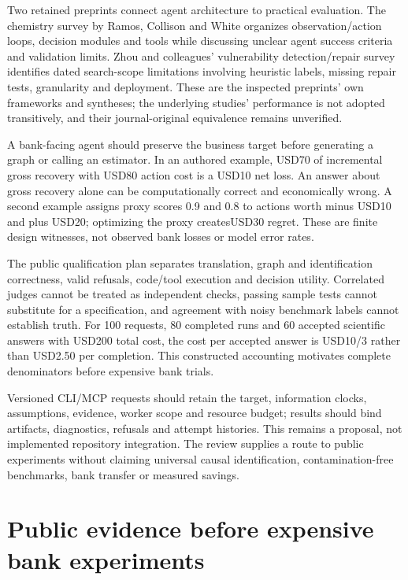 Two retained preprints connect agent architecture to practical
evaluation. The chemistry survey by Ramos, Collison and White organizes
observation/action loops, decision modules and tools while discussing
unclear agent success criteria and validation limits. Zhou and
colleagues' vulnerability detection/repair survey identifies dated
search-scope limitations involving heuristic labels, missing repair
tests, granularity and deployment. These are the inspected preprints'
own frameworks and syntheses; the underlying studies' performance is not
adopted transitively, and their journal-original equivalence remains
unverified. \citep{exec25_cow_chemistry,exec25_cow_vulnerability}

A bank-facing agent should preserve the business target before
generating a graph or calling an estimator. In an authored example,
USD70 of incremental gross recovery with USD80 action cost is a USD10
net loss. An answer about gross recovery alone can be computationally
correct and economically wrong. A second example assigns proxy scores
0.9 and 0.8 to actions worth minus USD10 and plus USD20; optimizing the
proxy createsUSD30 regret. These are finite design witnesses, not
observed bank losses or model error rates. \citep{exec25_cow_reference}

The public qualification plan separates translation, graph and
identification correctness, valid refusals, code/tool execution and
decision utility. Correlated judges cannot be treated as independent
checks, passing sample tests cannot substitute for a specification, and
agreement with noisy benchmark labels cannot establish truth. For 100
requests, 80 completed runs and 60 accepted scientific answers with
USD200 total cost, the cost per accepted answer is USD10/3 rather than
USD2.50 per completion. This constructed accounting motivates complete
denominators before expensive bank trials. \citep{exec25_cow_reference}

Versioned CLI/MCP requests should retain the target, information clocks,
assumptions, evidence, worker scope and resource budget; results should
bind artifacts, diagnostics, refusals and attempt histories. This
remains a proposal, not implemented repository integration. The review
supplies a route to public experiments without claiming universal causal
identification, contamination-free benchmarks, bank transfer or measured
savings. \citep{exec25_cow_reference}

\hypertarget{public-evidence-before-expensive-bank-experiments}{%
\section{Public evidence before expensive bank
experiments}\label{public-evidence-before-expensive-bank-experiments}}

